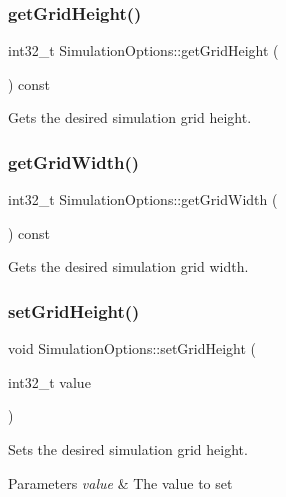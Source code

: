 \subsubsection{\texorpdfstring{getGridHeight()}{getGridHeight()}}
{\footnotesize\ttfamily int32\+\_\+t Simulation\+Options\+::get\+Grid\+Height (\begin{DoxyParamCaption}{ }\end{DoxyParamCaption}) const}



Gets the desired simulation grid height. 

\mbox{\label{class_simulation_options_adafceb9beefbc495dc1f79acfb7f44f5}} 
\subsubsection{\texorpdfstring{getGridWidth()}{getGridWidth()}}
{\footnotesize\ttfamily int32\+\_\+t Simulation\+Options\+::get\+Grid\+Width (\begin{DoxyParamCaption}{ }\end{DoxyParamCaption}) const}



Gets the desired simulation grid width. 

\mbox{\label{class_simulation_options_a61fb0af11a55e3cc7c5a6aab84c2a676}} 
\subsubsection{\texorpdfstring{setGridHeight()}{setGridHeight()}}
{\footnotesize\ttfamily void Simulation\+Options\+::set\+Grid\+Height (\begin{DoxyParamCaption}\item[{int32\+\_\+t}]{value }\end{DoxyParamCaption})}



Sets the desired simulation grid height. 


\begin{DoxyParams}{Parameters}
{\em value} & The value to set\\
\hline
\end{DoxyParams}
\mbox{\label{class_simulation_options_a0e99477f144c4d44c9f1eff1d1791b70}} 
